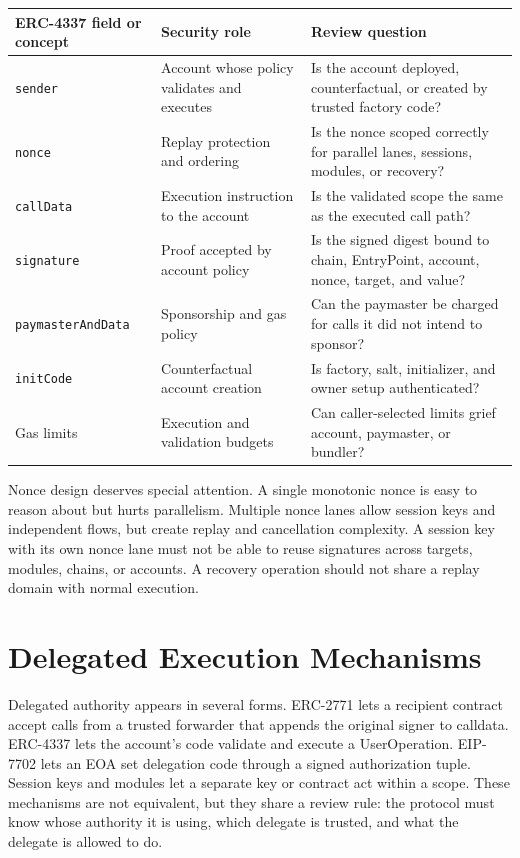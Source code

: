 \begin{table}[htbp]
\centering
\small
\renewcommand{\arraystretch}{1.14}
\begin{tabularx}{\textwidth}{@{}>{\RaggedRight\arraybackslash}p{}>{\RaggedRight\arraybackslash}p{}X@{}}
\toprule
ERC-4337 field or concept & Security role & Review question \\
\midrule
\texttt{sender} & Account whose policy validates and executes & Is the account deployed, counterfactual, or created by trusted factory code? \\
\texttt{nonce} & Replay protection and ordering & Is the nonce scoped correctly for parallel lanes, sessions, modules, or recovery? \\
\texttt{callData} & Execution instruction to the account & Is the validated scope the same as the executed call path? \\
\texttt{signature} & Proof accepted by account policy & Is the signed digest bound to chain, EntryPoint, account, nonce, target, and value? \\
\texttt{paymasterAndData} & Sponsorship and gas policy & Can the paymaster be charged for calls it did not intend to sponsor? \\
\texttt{initCode} & Counterfactual account creation & Is factory, salt, initializer, and owner setup authenticated? \\
Gas limits & Execution and validation budgets & Can caller-selected limits grief account, paymaster, or bundler? \\
\bottomrule
\end{tabularx}
\end{table}

Nonce design deserves special attention. A single monotonic nonce is easy to reason about but hurts parallelism. Multiple nonce lanes allow session keys and independent flows, but create replay and cancellation complexity. A session key with its own nonce lane must not be able to reuse signatures across targets, modules, chains, or accounts. A recovery operation should not share a replay domain with normal execution.

\section{Delegated Execution Mechanisms}

Delegated authority appears in several forms. ERC-2771 lets a recipient contract accept calls from a trusted forwarder that appends the original signer to calldata. ERC-4337 lets the account's code validate and execute a UserOperation. EIP-7702 lets an EOA set delegation code through a signed authorization tuple. Session keys and modules let a separate key or contract act within a scope. These mechanisms are not equivalent, but they share a review rule: the protocol must know whose authority it is using, which delegate is trusted, and what the delegate is allowed to do.

